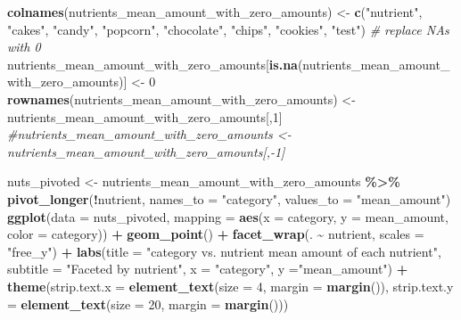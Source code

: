 \documentclass[
]{article}
\newenvironment{Shaded}{\begin{snugshade}}{\end{snugshade}}
\newcommand{\AttributeTok}[1]{\textcolor[rgb]{0.13,0.29,0.53}{#1}}
\newcommand{\CommentTok}[1]{\textcolor[rgb]{0.56,0.35,0.01}{\textit{#1}}}
\newcommand{\DecValTok}[1]{\textcolor[rgb]{0.00,0.00,0.81}{#1}}
\newcommand{\FunctionTok}[1]{\textcolor[rgb]{0.13,0.29,0.53}{\textbf{#1}}}
\newcommand{\NormalTok}[1]{#1}
\newcommand{\OtherTok}[1]{\textcolor[rgb]{0.56,0.35,0.01}{#1}}
\newcommand{\SpecialCharTok}[1]{\textcolor[rgb]{0.81,0.36,0.00}{\textbf{#1}}}
\newcommand{\StringTok}[1]{\textcolor[rgb]{0.31,0.60,0.02}{#1}}
\begin{document}
\begin{Shaded}
\begin{Highlighting}[]
\FunctionTok{colnames}\NormalTok{(nutrients\_mean\_amount\_with\_zero\_amounts) }\OtherTok{\textless{}{-}} \FunctionTok{c}\NormalTok{(}\StringTok{"nutrient"}\NormalTok{, }\StringTok{"cakes"}\NormalTok{, }\StringTok{"candy"}\NormalTok{, }\StringTok{"popcorn"}\NormalTok{, }\StringTok{"chocolate"}\NormalTok{, }\StringTok{"chips"}\NormalTok{, }\StringTok{"cookies"}\NormalTok{, }\StringTok{"test"}\NormalTok{)}
\CommentTok{\# replace NAs with 0}
\NormalTok{nutrients\_mean\_amount\_with\_zero\_amounts[}\FunctionTok{is.na}\NormalTok{(nutrients\_mean\_amount\_with\_zero\_amounts)] }\OtherTok{\textless{}{-}} \DecValTok{0}  
\FunctionTok{rownames}\NormalTok{(nutrients\_mean\_amount\_with\_zero\_amounts) }\OtherTok{\textless{}{-}}\NormalTok{ nutrients\_mean\_amount\_with\_zero\_amounts[,}\DecValTok{1}\NormalTok{]}
\CommentTok{\#nutrients\_mean\_amount\_with\_zero\_amounts \textless{}{-} nutrients\_mean\_amount\_with\_zero\_amounts[,{-}1]}
\end{Highlighting}
\end{Shaded}

\begin{Shaded}
\begin{Highlighting}[]
\NormalTok{nuts\_pivoted }\OtherTok{\textless{}{-}}\NormalTok{ nutrients\_mean\_amount\_with\_zero\_amounts }\SpecialCharTok{\%\textgreater{}\%} \FunctionTok{pivot\_longer}\NormalTok{(}\SpecialCharTok{!}\NormalTok{nutrient, }\AttributeTok{names\_to =} \StringTok{"category"}\NormalTok{, }\AttributeTok{values\_to =} \StringTok{"mean\_amount"}\NormalTok{)}
\FunctionTok{ggplot}\NormalTok{(}\AttributeTok{data =}\NormalTok{ nuts\_pivoted, }\AttributeTok{mapping =} \FunctionTok{aes}\NormalTok{(}\AttributeTok{x =}\NormalTok{ category, }\AttributeTok{y =}\NormalTok{ mean\_amount, }\AttributeTok{color =}\NormalTok{ category)) }\SpecialCharTok{+}
  \FunctionTok{geom\_point}\NormalTok{() }\SpecialCharTok{+}
  \FunctionTok{facet\_wrap}\NormalTok{(. }\SpecialCharTok{\textasciitilde{}}\NormalTok{ nutrient, }\AttributeTok{scales =} \StringTok{"free\_y"}\NormalTok{) }\SpecialCharTok{+}
  \FunctionTok{labs}\NormalTok{(}\AttributeTok{title =} \StringTok{"category vs. nutrient mean amount of each nutrient"}\NormalTok{,}
       \AttributeTok{subtitle =} \StringTok{"Faceted by nutrient"}\NormalTok{,}
       \AttributeTok{x =} \StringTok{"category"}\NormalTok{, }\AttributeTok{y =}\StringTok{"mean\_amount"}\NormalTok{) }\SpecialCharTok{+} 
  \FunctionTok{theme}\NormalTok{(}\AttributeTok{strip.text.x =} \FunctionTok{element\_text}\NormalTok{(}\AttributeTok{size =} \DecValTok{4}\NormalTok{, }\AttributeTok{margin =} \FunctionTok{margin}\NormalTok{()),}
        \AttributeTok{strip.text.y =} \FunctionTok{element\_text}\NormalTok{(}\AttributeTok{size =} \DecValTok{20}\NormalTok{, }\AttributeTok{margin =} \FunctionTok{margin}\NormalTok{()))}
\end{Highlighting}
\end{Shaded}
\end{document}
